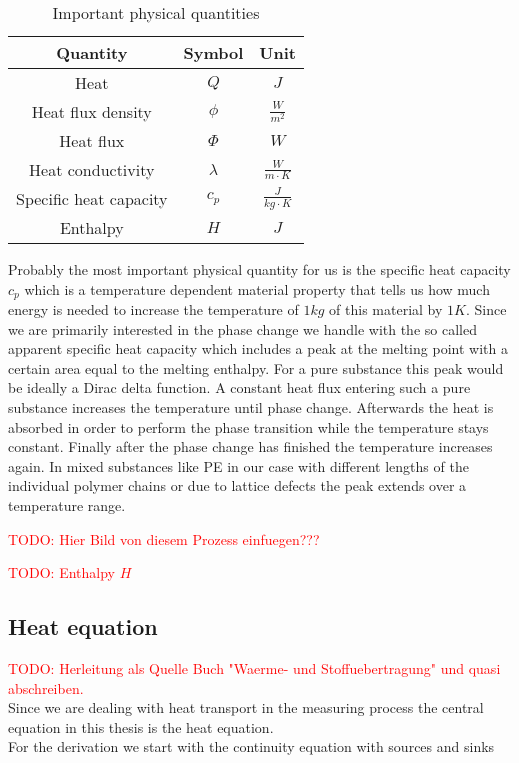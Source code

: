 \documentclass{scrartcl}[12pt, halfparskip]
\newcommand{\todo}[1]{\textcolor{red}{TODO: #1}}
\begin{document}
\begin{table}[H]
	\centering
\begin{tabular}{| c | c | c |} \hline
	Quantity & Symbol & Unit \\ \hline
	Heat & $Q$ & $J$ \\[0.7ex]
	Heat flux density & $\phi$ & $\frac{W}{m^2}$ \\[0.7ex]
	Heat flux & $\varPhi$ & $W$ \\[0.7ex]
	Heat conductivity & $\lambda$ & $\frac{W}{m \cdot K}$ \\[0.7ex]
	Specific heat capacity & $c_p$ & $\frac{J}{kg \cdot K}$ \\[0.7ex]
	Enthalpy & $H$ & $J$ \\ \hline
\end{tabular}
\caption{Important physical quantities}
\label{tab:important_physical_quantities}
\end{table}



Probably the most important physical quantity for us is the specific heat capacity $c_p$ which is a temperature dependent material property that tells us how much energy is needed to increase the temperature of $1kg$ of this material by $1K$. Since we are primarily interested in the phase change we handle with the so called apparent specific heat capacity which includes a peak at the melting point with a certain area equal to the melting enthalpy. For a pure substance this peak would be ideally a Dirac delta function. A constant heat flux entering such a pure substance increases the temperature until phase change. Afterwards the heat is absorbed in order to perform the phase transition while the temperature stays constant. Finally after the phase change has finished the temperature increases again. In mixed substances like PE in our case with different lengths of the individual polymer chains or due to lattice defects the peak extends over a temperature range.

\todo{Hier Bild von diesem Prozess einfuegen???} 

\todo{Enthalpy $H$}


\subsection{Heat equation}
\todo{Herleitung als Quelle Buch "Waerme- und Stoffuebertragung" \cite{lit:waerme_und_stoffuebertragung} und quasi abschreiben.} \\
Since we are dealing with heat transport in the measuring process the central equation in this thesis is the heat equation. \\
For the derivation we start with the continuity equation with sources and sinks
\end{document}
